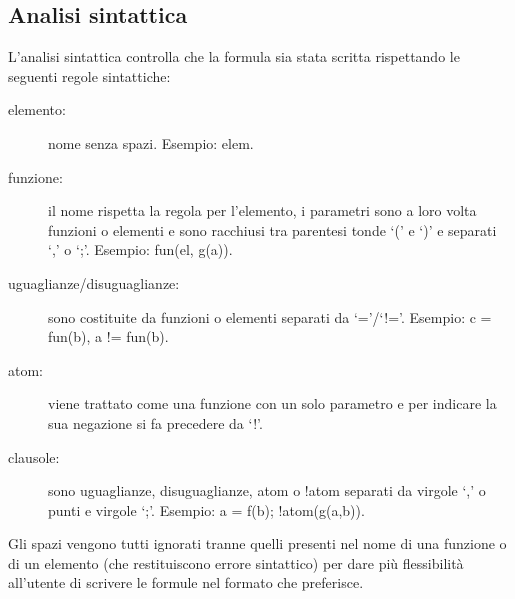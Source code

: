 \documentclass[a4paper,11pt]{article} %
\begin{document}
\subsection{Analisi sintattica}
L'analisi sintattica controlla che la formula sia stata scritta rispettando le seguenti 
regole sintattiche: 
\vspace{-1ex}
\begin{description}
\item[elemento:] nome senza spazi. Esempio: elem.
\vspace{-1.5ex}
\item[funzione:] il nome rispetta la regola per l'elemento, 
	i parametri sono a loro volta funzioni o elementi e sono racchiusi tra parentesi tonde `(' e `)'
	e separati %
	`,' o %
	`;'. Esempio: fun(el, g(a)).
\vspace{-1.5ex}
\item[uguaglianze/disuguaglianze:] sono costituite da funzioni o elementi separati da `='/`!='. Esempio: c = fun(b), a != fun(b).
\vspace{-1.5ex}
\item[atom:] viene trattato come una funzione con un solo parametro e per indicare la sua negazione
	si fa precedere da `!'.%
\vspace{-1.5ex}
\item[clausole:] sono uguaglianze, disuguaglianze, atom o !atom separati da virgole `,' 
	o punti e virgole `;'. Esempio: a = f(b); !atom(g(a,b)).%
\end{description}
\vspace{-1ex}
Gli spazi vengono tutti ignorati tranne quelli presenti nel nome di una funzione o di un elemento
(che restituiscono errore sintattico) per dare pi\`u flessibilit\`a all'utente di scrivere 
le formule nel formato che preferisce.

\end{document}
